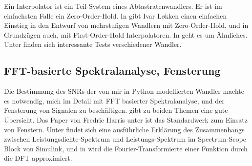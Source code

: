 \documentclass[11pt]{article}
\begin{document}
Ein Interpolator ist ein Teil-System eines Abtastratenwandlers. Er ist im einfachsten Falle ein Zero-Order-Hold. In \cite{Lokken2005} gibt Ivar Løkken 
einen einfachen Einstieg in den Entwurf von mehrstufigen Wandlern mit Zero-Order-Hold, und in Grundzügen auch, mit First-Order-Hold Interpolatoren. In \cite{Crochiere1981}
geht es um Ähnliches. Unter \cite{infinitewave_a} finden sich interessante Tests verschiedener Wandler. 

\subsection*{FFT-basierte Spektralanalyse, Fensterung}

Die Bestimmung des SNRs der von mir in Python modellierten Wandler machte es notwendig, mich im Detail mit FFT basierter Spektralanalyse, und der Fensterung von Signalen
zu beschäftigen. \cite{Heinzel2002} gibt zu beiden Themen eine gute Übersicht. Das Paper von Fredric Harris unter \cite{Harris1978} ist das Standardwerk zum Einsatz 
von Fenstern. Unter \cite{Hoffmann2007} findet sich eine ausführliche Erklärung des Zusammenhangs zwischen Leistungsdichte-Spektrum und Leistungs-Spektrum im Spectrum-Scope
Block von Simulink, und in \cite{Narcowich1998} wird die Fourier-Transformierte einer Funktion durch die DFT approximiert.
\newpage

\end{document}
